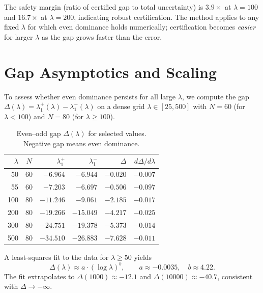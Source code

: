 \documentclass[12pt,a4paper]{article}
\theoremstyle{definition}
\theoremstyle{remark}
\begin{document}
\noindent The safety margin (ratio of certified gap to total uncertainty) is $3.9\times$ at $\lambda = 100$ and $16.7\times$ at $\lambda = 200$, indicating robust certification. The method applies to any fixed $\lambda$ for which even dominance holds numerically; certification becomes \emph{easier} for larger $\lambda$ as the gap grows faster than the error.


\section{Gap Asymptotics and Scaling}
\label{sec:gap-asymptotics}

To assess whether even dominance persists for all large $\lambda$, we compute the gap $\Delta(\lambda) = \lambda_1^+(\lambda) - \lambda_1^-(\lambda)$ on a dense grid $\lambda \in [25, 500]$ with $N = 60$ (for $\lambda < 100$) and $N = 80$ (for $\lambda \geq 100$).

\begin{table}[h]
\centering
\renewcommand{\arraystretch}{1.15}
\begin{tabular}{r|c|r|r|r|r}
$\lambda$ & $N$ & $\lambda_1^+$ & $\lambda_1^-$ & $\Delta$ & $d\Delta/d\lambda$ \\\hline
50  & 60 & $-6.964$ & $-6.944$ & $-0.020$ & $-0.007$ \\
55  & 60 & $-7.203$ & $-6.697$ & $-0.506$ & $-0.097$ \\
100 & 80 & $-11.246$ & $-9.061$ & $-2.185$ & $-0.017$ \\
200 & 80 & $-19.266$ & $-15.049$ & $-4.217$ & $-0.025$ \\
300 & 80 & $-24.751$ & $-19.378$ & $-5.373$ & $-0.014$ \\
500 & 80 & $-34.510$ & $-26.883$ & $-7.628$ & $-0.011$
\end{tabular}
\caption{Even--odd gap $\Delta(\lambda)$ for selected values. Negative gap means even dominance.}
\label{tab:gap-asymp}
\end{table}

A least-squares fit to the data for $\lambda \geq 50$ yields
\begin{equation}
\label{eq:gap-fit}
\Delta(\lambda) \approx a \cdot (\log\lambda)^b, \qquad a \approx -0.0035,\quad b \approx 4.22.
\end{equation}
The fit extrapolates to $\Delta(1000) \approx -12.1$ and $\Delta(10000) \approx -40.7$, consistent with $\Delta \to -\infty$.
\end{document}
